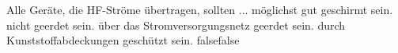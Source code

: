     {Alle Geräte, die HF-Ströme übertragen, sollten ...}
    {möglichst gut geschirmt sein.}
    {nicht geerdet sein.}
    {über das Stromversorgungsnetz geerdet sein.}
    {durch Kunststoffabdeckungen geschützt sein.}
    {false}{false}